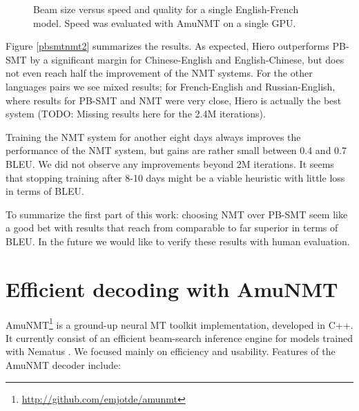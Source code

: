 \documentclass[11pt]{article}
\begin{document}
\begin{figure*}[t]
\centering
\caption{Beam size versus speed and quality for a single English-French model. Speed was evaluated with AmuNMT on a single GPU.}\label{beam}
\end{figure*}

Figure \ref{pbsmtnmt2} summarizes the results. As expected, Hiero outperforms PB-SMT by a significant margin for Chinese-English and English-Chinese, but does not even reach half the improvement of the NMT systems. For the other languages pairs we see mixed results; for French-English and Russian-English, where results for PB-SMT and NMT were very close, Hiero is actually the best system (TODO: Missing results here for the 2.4M iterations).

Training the NMT system for another eight days always improves the performance of the NMT system, but gains are rather small between 0.4 and 0.7 BLEU. We did not observe any improvements beyond 2M iterations. It seems that stopping training after 8-10 days might be a viable heuristic with little loss in terms of BLEU. 

To summarize the first part of this work: choosing NMT over PB-SMT seem like a good bet with results that reach from comparable to far superior in terms of BLEU. In the future we would like to verify these results with  human evaluation.

\section{Efficient decoding with AmuNMT}
AmuNMT\footnote{\url{http://github.com/emjotde/amunmt}} is a ground-up neural MT toolkit implementation, developed in C++. It currently consist of an efficient beam-search inference engine for models trained with Nematus \cite{DBLP:conf/wmt/SennrichHB16,DBLP:journals/corr/BahdanauCB14}. We focused mainly on efficiency and usability. Features of the AmuNMT decoder include:
\end{document}
